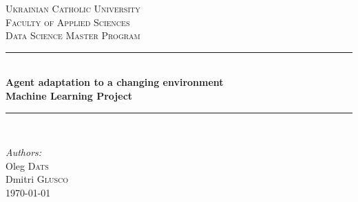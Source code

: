 \begin{titlepage}

\newcommand{\HRule}{\rule{\linewidth}{0.5mm}} %

\center %
 
\vspace*{0.5cm}
\textsc{\LARGE Ukrainian Catholic University}\\[1cm] %
\textsc{\Large  Faculty of Applied Sciences}\\[0.5cm] %
\textsc{\large Data Science Master Program}\\[0.5cm] %

\vspace*{1.5cm}

\HRule \\[0.4cm]
{ \huge \bfseries Agent adaptation to a changing environment}\\[10pt]
{\Large \bfseries Machine Learning Project}\\[0.4cm] %
\HRule \\[1cm]
 
\vspace*{2.5cm}

\Large \emph{Authors:}\\
Oleg  \textsc{Dats}\\
Dmitri \textsc{Glusco}\\ %

\vspace*{0.5cm}
{\large \today}\\[0.5cm] %


\end{titlepage}
